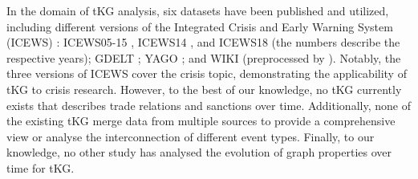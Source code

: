 In the domain of tKG analysis, six datasets have been published and utilized, including different versions of the Integrated Crisis and Early Warning System (ICEWS) \cite{Boschee2015}: ICEWS05-15 \cite{GarciaDuran2018ICEWS14}, ICEWS14 \cite{GarciaDuran2018ICEWS14}, and ICEWS18 \cite{Jin2019oldrenet} (the numbers describe the respective years); GDELT \cite{Leetaru2013GDELT}; YAGO \cite{Mahdisoltani2015YAGO}; and WIKI \cite{Leblay2018WIKI} (preprocessed by \citet{Jin2019oldrenet}). Notably, the three versions of ICEWS cover the crisis topic, demonstrating the applicability of tKG to crisis research. However, to the best of our knowledge, no tKG currently exists that describes trade relations and sanctions over time. Additionally, none of the existing tKG merge data from multiple sources to provide a comprehensive view or analyse the interconnection of different event types. Finally, to our knowledge, no other study has analysed the evolution of graph properties over time for tKG.
